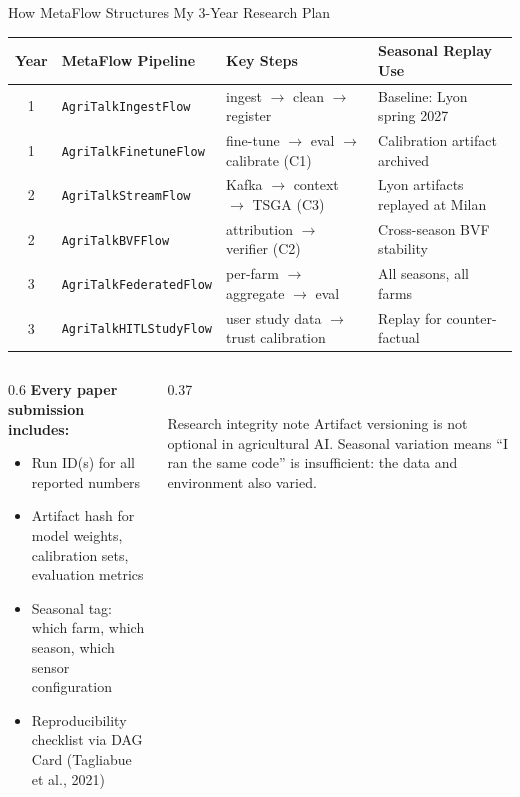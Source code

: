 \documentclass[10pt,aspectratio=169]{beamer}
\begin{document}
\begin{frame}{How MetaFlow Structures My 3-Year Research Plan}

\begin{center}\small
\begin{tabular}{@{}clll@{}}
\toprule
\textbf{Year} & \textbf{MetaFlow Pipeline} & \textbf{Key Steps} & \textbf{Seasonal Replay Use} \\
\midrule
1 & \texttt{AgriTalkIngestFlow} & ingest $\to$ clean $\to$ register & Baseline: Lyon spring 2027 \\
1 & \texttt{AgriTalkFinetuneFlow} & fine-tune $\to$ eval $\to$ calibrate (C1) & Calibration artifact archived \\
\midrule
2 & \texttt{AgriTalkStreamFlow} & Kafka $\to$ context $\to$ TSGA (C3) & Lyon artifacts replayed at Milan \\
2 & \texttt{AgriTalkBVFFlow} & attribution $\to$ verifier (C2) & Cross-season BVF stability \\
\midrule
3 & \texttt{AgriTalkFederatedFlow} & per-farm $\to$ aggregate $\to$ eval & All seasons, all farms \\
3 & \texttt{AgriTalkHITLStudyFlow} & user study data $\to$ trust calibration & Replay for counter-factual \\
\bottomrule
\end{tabular}
\end{center}

\vspace{0.3cm}
\begin{columns}
\begin{column}{0.6\textwidth}
\small
\textbf{Every paper submission includes:}
\begin{itemize}
  \item Run ID(s) for all reported numbers
  \item Artifact hash for model weights, calibration sets, evaluation metrics
  \item Seasonal tag: which farm, which season, which sensor configuration
  \item Reproducibility checklist via DAG Card (Tagliabue et al., 2021)
\end{itemize}
\end{column}
\begin{column}{0.37\textwidth}
\begin{alertblock}{Research integrity note}
\small Artifact versioning is not optional in agricultural AI. Seasonal variation means ``I ran the same code'' is insufficient: the data and environment also varied.
\end{alertblock}
\end{column}
\end{columns}

\end{frame}
\end{document}
